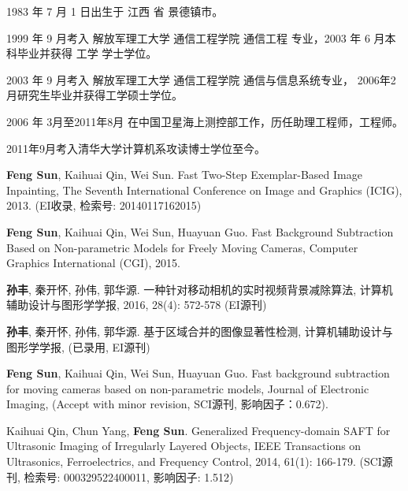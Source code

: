 \begin{resume}


  1983 年 7 月 1 日出生于 江西 省 景德镇市。

  1999 年 9 月考入 解放军理工大学 通信工程学院  通信工程 专业，2003 年 6 月本科毕业并获得 工学 学士学位。

  2003 年 9 月考入 解放军理工大学 通信工程学院 通信与信息系统专业， 2006年2月研究生毕业并获得工学硕士学位。

  2006 年 3月至2011年8月 在中国卫星海上测控部工作，历任助理工程师，工程师。

  2011年9月考入清华大学计算机系攻读博士学位至今。




  \begin{publications}
    \item {\bf Feng Sun}, Kaihuai Qin, Wei Sun. Fast Two-Step Exemplar-Based Image Inpainting,
   The Seventh International Conference on Image and Graphics (ICIG), 2013. (EI收录, 检索号: 20140117162015)
    \item  {\bf Feng Sun}, Kaihuai Qin, Wei Sun, Huayuan Guo. Fast Background Subtraction Based on Non-parametric Models for Freely Moving Cameras,
    Computer Graphics International (CGI), 2015.
    \item {\bf 孙丰}, 秦开怀, 孙伟, 郭华源. 一种针对移动相机的实时视频背景减除算法, 计算机辅助设计与图形学学报, 2016, 28(4): 572-578 (EI源刊)


    \item {\bf 孙丰}, 秦开怀, 孙伟, 郭华源. 基于区域合并的图像显著性检测, 计算机辅助设计与图形学学报, (已录用, EI源刊)
    \item  {\bf Feng Sun}, Kaihuai Qin, Wei Sun, Huayuan Guo. Fast background subtraction for moving cameras based on non-parametric models,
    Journal of Electronic Imaging, (Accept with minor revision, SCI源刊, 影响因子：0.672).

    \item  Kaihuai Qin, Chun Yang, {\bf Feng Sun}. Generalized Frequency-domain SAFT for Ultrasonic Imaging of Irregularly Layered Objects,
    IEEE Transactions on Ultrasonics, Ferroelectrics, and Frequency Control, 2014, 61(1): 166-179. (SCI源刊, 检索号: 000329522400011, 影响因子: 1.512)





\end{publications}
\end{resume}

